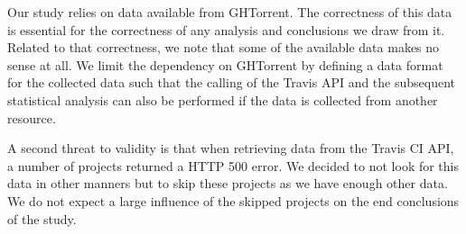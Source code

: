 Our study relies on data available from GHTorrent. 
The correctness of this data is essential for the correctness of any analysis and conclusions we draw from it.
Related to that correctness, we note that some of the available data makes no sense at all.
We limit the dependency on GHTorrent by defining a data format for the collected data such that the calling of the Travis API and the subsequent statistical analysis can also be performed if the data is collected from another resource.

A second threat to validity is that when retrieving data from the Travis CI API, a number of projects returned a HTTP 500 error.
We decided to not look for this data in other manners but to skip these projects as we have enough other data.
We do not expect a large influence of the skipped projects on the end conclusions of the study.
